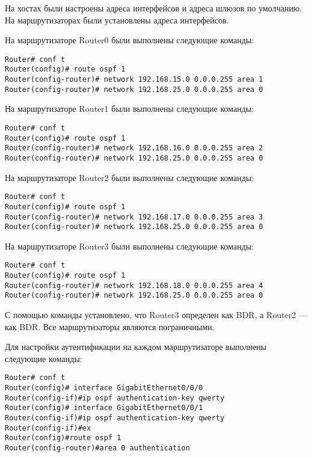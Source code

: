На хостах были настроены адреса интерфейсов и адреса шлюзов по умолчанию. На маршрутизаторах были установлены адреса интерфейсов.

На маршрутизаторе Router0 были выполнены следующие команды:
\begin{lstlisting}[numbers=none]
Router# conf t
Router(config)# route ospf 1
Router(config-router)# network 192.168.15.0 0.0.0.255 area 1
Router(config-router)# network 192.168.25.0 0.0.0.255 area 0
\end{lstlisting}

На маршрутизаторе Router1 были выполнены следующие команды:
\begin{lstlisting}[numbers=none]
Router# conf t
Router(config)# route ospf 1
Router(config-router)# network 192.168.16.0 0.0.0.255 area 2
Router(config-router)# network 192.168.25.0 0.0.0.255 area 0
\end{lstlisting}

На маршрутизаторе Router2 были выполнены следующие команды:
\begin{lstlisting}[numbers=none]
Router# conf t
Router(config)# route ospf 1
Router(config-router)# network 192.168.17.0 0.0.0.255 area 3
Router(config-router)# network 192.168.25.0 0.0.0.255 area 0
\end{lstlisting}

На маршрутизаторе Router3 были выполнены следующие команды:
\begin{lstlisting}[numbers=none]
Router# conf t
Router(config)# route ospf 1
Router(config-router)# network 192.168.18.0 0.0.0.255 area 4
Router(config-router)# network 192.168.25.0 0.0.0.255 area 0
\end{lstlisting}

С помощью команды  установлено, что Router3 определен как BDR, а Router2 --- как BDR. Все маршрутизаторы являются пограничными.

Для настройки аутентификации на каждом маршрутизаторе выполнены следующие команды:
\begin{lstlisting}[numbers=none]
Router# conf t
Router(config)# interface GigabitEthernet0/0/0
Router(config-if)#ip ospf authentication-key qwerty
Router(config)# interface GigabitEthernet0/0/1
Router(config-if)#ip ospf authentication-key qwerty
Router(config-if)#ex
Router(config)#route ospf 1
Router(config-router)#area 0 authentication
\end{lstlisting}